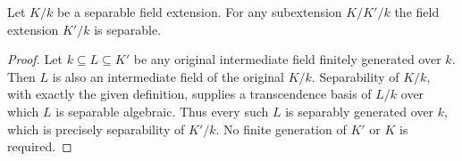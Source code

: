 \begin{lemma}
\label{editorial-source-lemma-subextensions-are-separable}
Let $K/k$ be a separable field extension.
For any subextension $K/K'/k$ the field
extension $K'/k$ is separable.
\end{lemma}

\begin{proof}
Let $k\subseteq L\subseteq K'$ be any original
intermediate field finitely generated over $k$.
Then $L$ is also an intermediate field of the
original $K/k$. Separability of $K/k$, with
exactly the given definition, supplies a
transcendence basis of $L/k$ over which $L$
is separable algebraic. Thus every such $L$
is separably generated over $k$, which is
precisely separability of $K'/k$. No finite
generation of $K'$ or $K$ is required.
\end{proof}
